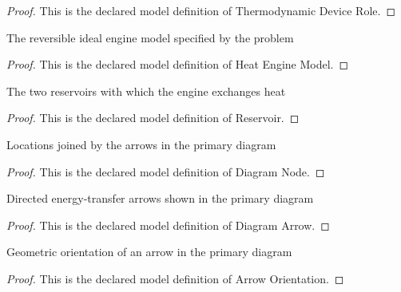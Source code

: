 \begin{proof}
  This is the declared model definition of Thermodynamic Device Role.
\end{proof}
\begin{definition}
  \label{def:physics:phyx-mini-0474:phyxminiproblems-problemphyxmini0474-heatenginemodel}
  The reversible ideal engine model specified by the problem
\end{definition}
\begin{proof}
  This is the declared model definition of Heat Engine Model.
\end{proof}
\begin{definition}[Reservoir]
  \label{def:physics:phyx-mini-0474:phyxminiproblems-problemphyxmini0474-reservoir}
  The two reservoirs with which the engine exchanges heat
\end{definition}
\begin{proof}
  This is the declared model definition of Reservoir.
\end{proof}
\begin{definition}
  \label{def:physics:phyx-mini-0474:phyxminiproblems-problemphyxmini0474-diagramnode}
  Locations joined by the arrows in the primary diagram
\end{definition}
\begin{proof}
  This is the declared model definition of Diagram Node.
\end{proof}
\begin{definition}
  \label{def:physics:phyx-mini-0474:phyxminiproblems-problemphyxmini0474-diagramarrow}
  Directed energy-transfer arrows shown in the primary diagram
\end{definition}
\begin{proof}
  This is the declared model definition of Diagram Arrow.
\end{proof}
\begin{definition}
  \label{def:physics:phyx-mini-0474:phyxminiproblems-problemphyxmini0474-arroworientation}
  Geometric orientation of an arrow in the primary diagram
\end{definition}
\begin{proof}
  This is the declared model definition of Arrow Orientation.
\end{proof}
